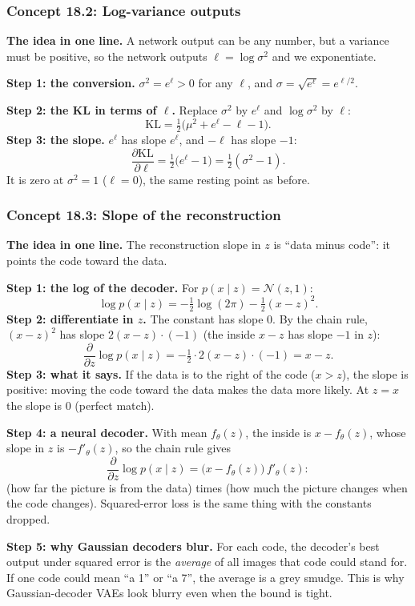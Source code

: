 \documentclass[12pt,a4paper]{article}
\begin{document}
\subsubsection{Concept 18.2: Log-variance outputs}\label{c18-2}

\textbf{The idea in one line.} A network output can be any number, but a variance must be positive, so the network outputs $\ell=\log\sigma^2$ and we exponentiate.

\textbf{Step 1: the conversion.} $\sigma^2=e^{\ell}>0$ for any $\ell$, and $\sigma=\sqrt{e^{\ell}}=e^{\ell/2}$.

\textbf{Step 2: the KL in terms of $\ell$.} Replace $\sigma^2$ by $e^\ell$ and $\log\sigma^2$ by $\ell$:
\[
\mathrm{KL}=\tfrac12\big(\mu^2+e^{\ell}-\ell-1\big).
\]
\textbf{Step 3: the slope.} $e^\ell$ has slope $e^\ell$, and $-\ell$ has slope $-1$:
\[
\frac{\partial\mathrm{KL}}{\partial\ell}=\tfrac12\big(e^{\ell}-1\big)=\tfrac12(\sigma^2-1).
\]
It is zero at $\sigma^2=1$ ($\ell=0$), the same resting point as before.

\subsubsection{Concept 18.3: Slope of the reconstruction}\label{c18-3}

\textbf{The idea in one line.} The reconstruction slope in $z$ is ``data minus code'': it points the code toward the data.

\textbf{Step 1: the log of the decoder.} For $p(x\mid z)=\mathcal{N}(z,1)$:
\[
\log p(x\mid z)=-\tfrac12\log(2\pi)-\tfrac12(x-z)^2 .
\]
\textbf{Step 2: differentiate in $z$.} The constant has slope 0. By the chain rule, $(x-z)^2$ has slope $2(x-z)\cdot(-1)$ (the inside $x-z$ has slope $-1$ in $z$):
\[
\frac{\partial}{\partial z}\log p(x\mid z)=-\tfrac12\cdot2(x-z)\cdot(-1)=x-z .
\]
\textbf{Step 3: what it says.} If the data is to the right of the code ($x>z$), the slope is positive: moving the code toward the data makes the data more likely. At $z=x$ the slope is 0 (perfect match).

\textbf{Step 4: a neural decoder.} With mean $f_\theta(z)$, the inside is $x-f_\theta(z)$, whose slope in $z$ is $-f'_\theta(z)$, so the chain rule gives
\[
\frac{\partial}{\partial z}\log p(x\mid z)=\big(x-f_\theta(z)\big)\,f'_\theta(z):
\]
(how far the picture is from the data) times (how much the picture changes when the code changes). Squared-error loss is the same thing with the constants dropped.

\textbf{Step 5: why Gaussian decoders blur.} For each code, the decoder's best output under squared error is the \emph{average} of all images that code could stand for. If one code could mean ``a 1'' or ``a 7'', the average is a grey smudge. This is why Gaussian-decoder VAEs look blurry even when the bound is tight.
\end{document}
